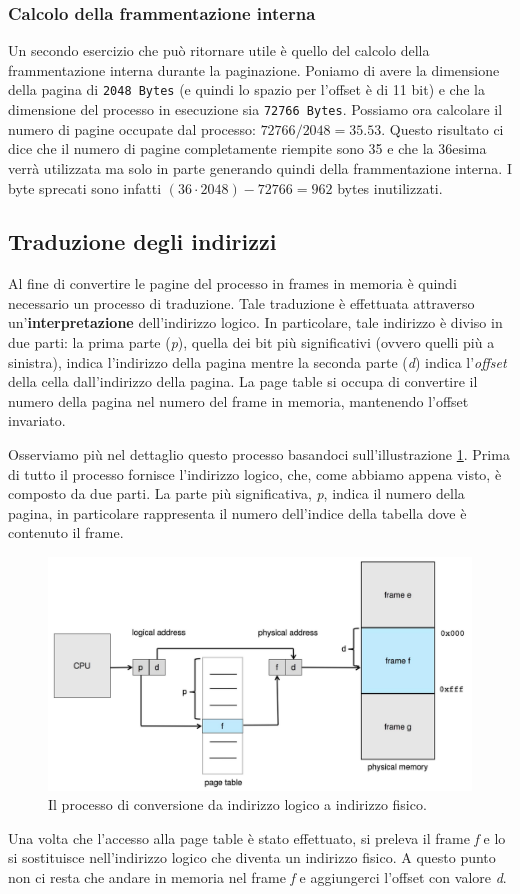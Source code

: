 % 
\subsubsection*{Calcolo della frammentazione interna}
Un secondo esercizio che può ritornare utile è quello del calcolo della frammentazione interna durante la paginazione. Poniamo di avere la dimensione della pagina di \texttt{2048 Bytes} (e quindi lo spazio per l'offset è di 11 bit) e che la dimensione del processo in esecuzione sia \texttt{72766 Bytes}. Possiamo ora calcolare il numero di pagine occupate dal processo: $72766 / 2048 = 35.53$. Questo risultato ci dice che il numero di pagine completamente riempite sono 35 e che la 36esima verrà utilizzata ma solo in parte generando quindi della frammentazione interna. I byte sprecati sono infatti $(36 \cdot 2048) - 72766 = 962$ bytes inutilizzati. 

% 
\subsection{Traduzione degli indirizzi}
Al fine di convertire le pagine del processo in frames in memoria è quindi necessario un processo di traduzione. Tale traduzione è effettuata attraverso un'\textbf{interpretazione} dell'indirizzo logico. In particolare, tale indirizzo è diviso in due parti: la prima parte (\textit{p}), quella dei bit più significativi (ovvero quelli più a sinistra), indica l'indirizzo della pagina mentre la seconda parte (\textit{d}) indica l'\textit{offset} della cella dall'indirizzo della pagina. La page table si occupa di convertire il numero della pagina nel numero del frame in memoria, mantenendo l'offset invariato.

Osserviamo più nel dettaglio questo processo basandoci sull'illustrazione \ref{fig:paging_hardware}. Prima di tutto il processo fornisce l'indirizzo logico, che, come abbiamo appena visto, è composto da due parti. La parte più significativa, \textit{p}, indica il numero della pagina, in particolare rappresenta il numero dell'indice della tabella dove è contenuto il frame.
\begin{figure}[h]
    \centering
    \includegraphics[width = .8\textwidth]{../res/imgs/main memory/paging_hardware.png}
    \caption{Il processo di conversione da indirizzo logico a indirizzo fisico.}
    \label{fig:paging_hardware}
\end{figure}
 Una volta che l'accesso alla page table è stato effettuato, si preleva il frame \textit{f} e lo si sostituisce nell'indirizzo logico che diventa un indirizzo fisico. A questo punto non ci resta che andare in memoria nel frame \textit{f} e aggiungerci l'offset con valore \textit{d}.

